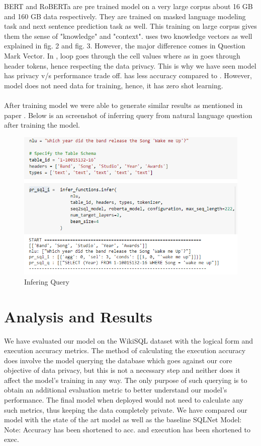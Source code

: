 \documentclass[12pt]{article}
\begin{document}
BERT and RoBERTa are pre trained model on a very large corpus about 16 GB and 160 GB data respectively. They are trained on masked language modeling task and next sentence prediction task as well. This training on large corpus gives them the sense of "knowledge" and "context". \cite{guo2019content} uses two knowledge vectors as well explained in fig. 2 and fig. 3. However, the major difference comes in Question Mark Vector. In \cite{guo2019content}, loop goes through the cell values where as in  \cite{pal2020data} goes through header tokens, hence respecting the data privacy. This is why we have seen  \cite{pal2020data} model has privacy v/s performance trade off.  \cite{pal2020data} has less accuracy compared to \cite{guo2019content}. However, \cite{pal2020data} model does not need data for training, hence, it has zero shot learning. 
\\
\\
After training model we were able to generate similar results as mentioned in paper \cite{pal2020data}. Below is an screenshot of inferring query from natural language question after training the model. 


\begin{figure}[H]
    \includegraphics[width=400pt]{infer}
    \caption{Infering Query}
    \label{fig:Infering Query}
\end{figure}




\section{Analysis and Results}


We have evaluated our model on the WikiSQL dataset with
the logical form and execution accuracy metrics. The method
of calculating the execution accuracy does involve the model
querying the database which goes against our core objective of
data privacy, but this is not a necessary step and neither does
it affect the model’s training in any way. The only purpose of
such querying is to obtain an additional evaluation metric to
better understand our model’s performance. The final model
when deployed would not need to calculate any such metrics,
thus keeping the data completely private.
We have compared our model with the state of the art model
as well as the baseline SQLNet Model:
Note: Accuracy has been shortened to acc. and execution
has been shortened to exec.
 
\end{document}

